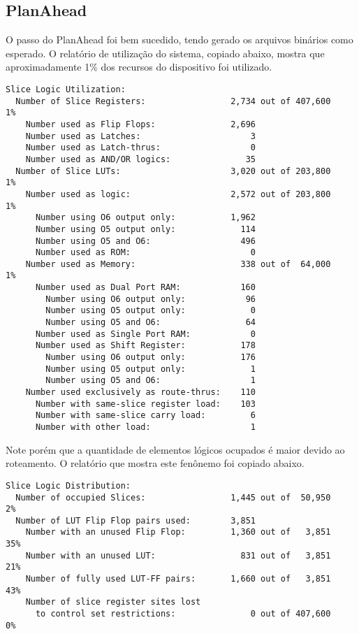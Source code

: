 \documentclass[11pt,a4paper,oneside]{book}
\begin{document}
\subsection{PlanAhead}
O passo do PlanAhead foi bem sucedido, tendo gerado os arquivos binários como esperado.
O relatório de utilização do sistema, copiado abaixo, mostra que aproximadamente 1\% dos recursos do dispositivo foi utilizado.
\begin{lstlisting}
Slice Logic Utilization:
  Number of Slice Registers:                 2,734 out of 407,600    1%
    Number used as Flip Flops:               2,696
    Number used as Latches:                      3
    Number used as Latch-thrus:                  0
    Number used as AND/OR logics:               35
  Number of Slice LUTs:                      3,020 out of 203,800    1%
    Number used as logic:                    2,572 out of 203,800    1%
      Number using O6 output only:           1,962
      Number using O5 output only:             114
      Number using O5 and O6:                  496
      Number used as ROM:                        0
    Number used as Memory:                     338 out of  64,000    1%
      Number used as Dual Port RAM:            160
        Number using O6 output only:            96
        Number using O5 output only:             0
        Number using O5 and O6:                 64
      Number used as Single Port RAM:            0
      Number used as Shift Register:           178
        Number using O6 output only:           176
        Number using O5 output only:             1
        Number using O5 and O6:                  1
    Number used exclusively as route-thrus:    110
      Number with same-slice register load:    103
      Number with same-slice carry load:         6
      Number with other load:                    1
\end{lstlisting}

Note porém que a quantidade de elementos lógicos ocupados é maior devido ao roteamento.
O relatório que mostra este fenônemo foi copiado abaixo.
\begin{lstlisting}
Slice Logic Distribution:
  Number of occupied Slices:                 1,445 out of  50,950    2%
  Number of LUT Flip Flop pairs used:        3,851
    Number with an unused Flip Flop:         1,360 out of   3,851   35%
    Number with an unused LUT:                 831 out of   3,851   21%
    Number of fully used LUT-FF pairs:       1,660 out of   3,851   43%
    Number of slice register sites lost
      to control set restrictions:               0 out of 407,600    0%
\end{lstlisting}
\end{document}
